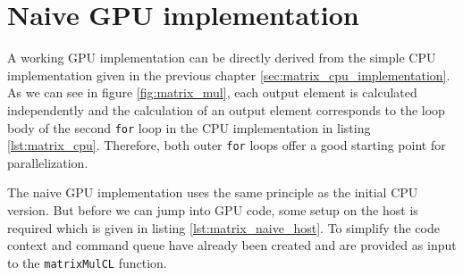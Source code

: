 \section{Naive GPU implementation}
\label{sec:matrix_mul_naive}

A working GPU implementation can be directly derived from the simple CPU implementation given in the previous chapter \ref{sec:matrix_cpu_implementation}. As we can see in figure \ref{fig:matrix_mul}, each output element is calculated independently and the calculation of an output element corresponds to the loop body of the second \lstinline!for! loop in the CPU implementation in listing \ref{lst:matrix_cpu}. Therefore, both outer \lstinline!for! loops offer a good starting point for parallelization. 

The naive GPU implementation uses the same principle as the initial CPU version. But before we can jump into GPU code, some setup on the host is required which is given in listing \ref{lst:matrix_naive_host}. To simplify the code context and command queue have already been created and are provided as input to the \lstinline!matrixMulCL! function.



